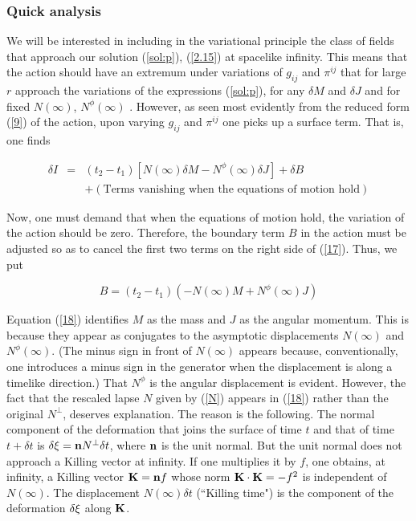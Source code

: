 \documentclass[12pt]{article}
\newcounter{c1} \newcounter{c2}
\newcommand{\bb}{\begin{equation}}
\newcommand{\ee}{\end{equation}}
\newcommand{\br}{\begin{eqnarray}}
\newcommand{\er}{\end{eqnarray}}
\begin{document}

\subsubsection{ Quick analysis}

We will be interested in including in the variational principle
the class of fields that approach  our solution (\ref{sol:p}),
(\ref{2.15}) at spacelike infinity. This means that the action
should have an extremum under variations of $g_{ij}$ and
$\pi^{ij}$ that for large $r$ approach the variations of the
expressions (\ref{sol:p}), for any $\delta M$ and $\delta J$ and
for fixed $N(\infty)$, $N^{\phi}(\infty)$ . However, as
seen most evidently from the reduced form (\ref{9}) of the
action, upon varying $g_{ij}$ and $\pi ^{ij}$ one picks up a
surface term. That is, one finds

\br
\delta I & = & (t_2 - t_1) [N(\infty) \delta M - N^{\phi} (\infty) \delta J]
 		  + \delta B \nonumber \\  & & + (\mbox{Terms vanishing
when the equations of motion hold})
\label{17}
\er


Now, one must demand that when the equations of motion hold, the
variation of the action should be zero\cite{5}. Therefore,
the boundary term $B$ in the action must be adjusted so as to
cancel the first two terms on the right side of (\ref{17}).
Thus, we put

\bb
B= (t_2 -t_1) (-N(\infty) M + N^{\phi} (\infty) J)
\label{18}
\ee


Equation (\ref{18}) identifies $M$ as the mass and $J$ as the
angular momentum. This is because they appear as conjugates to
the asymptotic displacements $N(\infty)$ and $N^{\phi}(\infty)$.
(The minus sign in front of $N(\infty)$ appears because,
conventionally, one introduces a minus sign in the generator
when the displacement is along a timelike direction.) That
$N^{\phi}$ is the angular displacement is evident. However, the
fact that the rescaled lapse $N$ given by (\ref{N}) appears in
(\ref{18}) rather than the original $N^{\perp}$, deserves
explanation. The reason is the following.  The normal component
of the deformation that joins the surface of time $t$ and that
of time $t + \delta t$ is $\delta {\bf \xi} = {\bf n} N^{\perp}
\delta t$, where ${\bf n}$ is the unit
normal. But the unit normal does not approach a Killing vector
at infinity. If one multiplies it by $f$, one obtains, at
infinity, a Killing vector ${\bf K} = {\bf n}f$ whose norm ${\bf
K} \cdot {\bf K} = - f^2$ is independent of $N(\infty)$. The
displacement $N(\infty) \delta t$ (``Killing time") is the
component of the deformation $\delta{\bf \xi}$ along ${\bf K}$.
\end{document}
